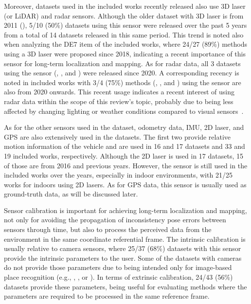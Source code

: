 Moreover, datasets used in the included works recently released also use 3D laser (or LiDAR) and radar sensors. Although the older dataset with 3D laser is from 2011 (), 5/10 (50\%) datasets using this sensor were released over the past 5 years from a total of 14 datasets released in this same period. This trend is noted also when analyzing the DE7 item of the included works, where 24/27 (89\%) methods using a 3D laser were proposed since 2018, indicating a recent importance of this sensor for long-term localization and mapping.
As for radar data, all 3 datasets using the sensor (, , and ) were released since 2020. A corresponding recency is noted in included works with 3/4 (75\%) methods (\cite{martini-et-al:2020:s20216002}, \cite{yin-et-al:2021:661199}, and \cite{hong-et-al:2022:02783649221080483}) using the sensor are also from 2020 onwards. This recent usage indicates a recent interest of using radar data within the scope of this review's topic, probably due to being less affected by changing lighting or weather conditions compared to visual sensors~\parencite{hong-et-al:2022:02783649221080483}.

As for the other sensors used in the dataset, odometry data, IMU, 2D laser, and GPS are also extensively used in the datasets.
The first two provide relative motion information of the vehicle and are used in 16 and 17 datasets and 33 and 19 included works, respectively.
Although the 2D laser is used in 17 datasets, 15 of those are from 2016 and previous years. However, the sensor is still used in the included works over the years, especially in indoor environments, with 21/25 works for indoors using 2D lasers.
As for GPS data, this sensor is usually used as ground-truth data, as will be discussed later.

Sensor calibration is important for achieving long-term localization and mapping, not only for avoiding the propagation of inconsistency pose errors between sensors through time, but also to process the perceived data from the environment in the same coordinate referential frame. The intrinsic calibration is usually relative to camera sensors, where 25/37 (68\%) datasets with this sensor provide the intrinsic parameters to the user. Some of the datasets with cameras do not provide those parameters due to being intended only for image-based place recognition (e.g., , , or ).
In terms of extrinsic calibration, 24/43 (56\%) datasets provide these parameters, being useful for evaluating methods where the parameters are required to be processed in the same reference frame.

